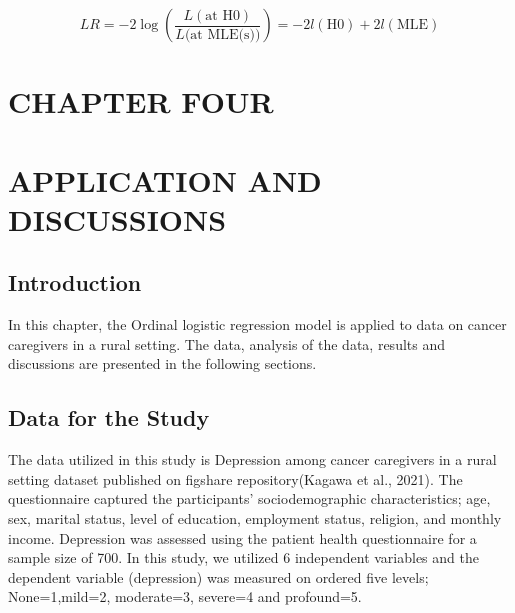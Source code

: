 \documentclass[12pt]{article}\usepackage[]{graphicx}\usepackage[]{xcolor}
\numberwithin{equation}{section}
\numberwithin{figure}{section}
\begin{document}
\begin{equation}
LR = -2 \log \left( \frac{{L(\text{{at H0}})}}{{L(\text{{at MLE(s)})}}} \right) = -2l(\text{{H0}}) + 2l(\text{{MLE}})
\label{eq:3.10}
\end{equation}

\newpage

\section*{CHAPTER FOUR}
\section*{APPLICATION AND DISCUSSIONS}
\setcounter{section}{4}
\setcounter{subsection}{0}
\subsection{Introduction}
In this chapter, the Ordinal logistic regression model is applied to data on cancer caregivers in a rural setting. The data, analysis of the data, results and discussions are presented in the following sections.

\subsection{Data for the Study}
The data utilized in this study is Depression among cancer caregivers in a rural setting dataset published on figshare repository(Kagawa et al., 2021). The questionnaire captured the participants' sociodemographic characteristics; age, sex, marital status, level of education, employment status, religion, and monthly income. Depression was assessed using the patient health questionnaire for a sample size of 700.
\noindent In this study, we utilized 6 independent variables and the dependent variable (depression) was measured on ordered five levels; None=1,mild=2, moderate=3, severe=4 and profound=5.
\end{document}
